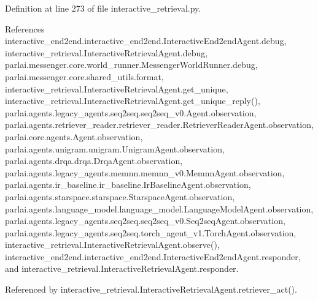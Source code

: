 Definition at line 273 of file interactive\+\_\+retrieval.\+py.



References interactive\+\_\+end2end.\+interactive\+\_\+end2end.\+Interactive\+End2end\+Agent.\+debug, interactive\+\_\+retrieval.\+Interactive\+Retrieval\+Agent.\+debug, parlai.\+messenger.\+core.\+world\+\_\+runner.\+Messenger\+World\+Runner.\+debug, parlai.\+messenger.\+core.\+shared\+\_\+utils.\+format, interactive\+\_\+retrieval.\+Interactive\+Retrieval\+Agent.\+get\+\_\+unique, interactive\+\_\+retrieval.\+Interactive\+Retrieval\+Agent.\+get\+\_\+unique\+\_\+reply(), parlai.\+agents.\+legacy\+\_\+agents.\+seq2seq.\+seq2seq\+\_\+v0.\+Agent.\+observation, parlai.\+agents.\+retriever\+\_\+reader.\+retriever\+\_\+reader.\+Retriever\+Reader\+Agent.\+observation, parlai.\+core.\+agents.\+Agent.\+observation, parlai.\+agents.\+unigram.\+unigram.\+Unigram\+Agent.\+observation, parlai.\+agents.\+drqa.\+drqa.\+Drqa\+Agent.\+observation, parlai.\+agents.\+legacy\+\_\+agents.\+memnn.\+memnn\+\_\+v0.\+Memnn\+Agent.\+observation, parlai.\+agents.\+ir\+\_\+baseline.\+ir\+\_\+baseline.\+Ir\+Baseline\+Agent.\+observation, parlai.\+agents.\+starspace.\+starspace.\+Starspace\+Agent.\+observation, parlai.\+agents.\+language\+\_\+model.\+language\+\_\+model.\+Language\+Model\+Agent.\+observation, parlai.\+agents.\+legacy\+\_\+agents.\+seq2seq.\+seq2seq\+\_\+v0.\+Seq2seq\+Agent.\+observation, parlai.\+agents.\+legacy\+\_\+agents.\+seq2seq.\+torch\+\_\+agent\+\_\+v1.\+Torch\+Agent.\+observation, interactive\+\_\+retrieval.\+Interactive\+Retrieval\+Agent.\+observe(), interactive\+\_\+end2end.\+interactive\+\_\+end2end.\+Interactive\+End2end\+Agent.\+responder, and interactive\+\_\+retrieval.\+Interactive\+Retrieval\+Agent.\+responder.



Referenced by interactive\+\_\+retrieval.\+Interactive\+Retrieval\+Agent.\+retriever\+\_\+act().

